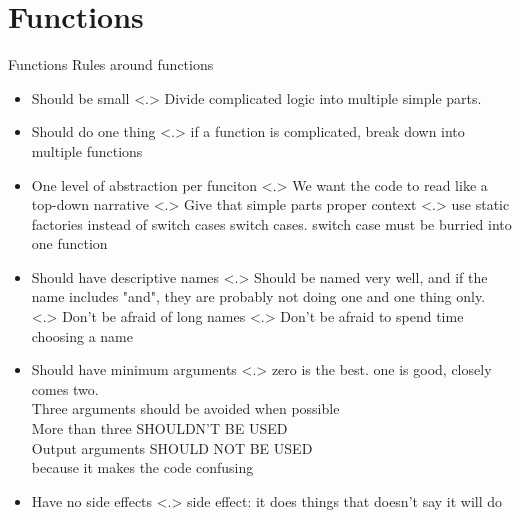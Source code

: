 \documentclass{beamer}
\begin{document}
\section{Functions}
\begin{frame}{Functions}
  Rules around functions
  \begin{itemize}[<+->]
    \item Should be small
    \note[item]<.>{
      Divide complicated logic into multiple simple parts.
    }
    \item Should do one thing
    \note[item]<.>{
      if a function is complicated, break down into multiple functions
    }
    \item One level of abstraction per funciton
    \note[item]<.>{
      We want the code to read like a top-down narrative
    }
    \note[item]<.>{
      Give that simple parts proper context
    }
    \note[item]<.>{
      use static factories instead of switch cases switch cases. switch case must be burried into one function
    }
    \item Should have descriptive names
    \note[item]<.>{
      Should be named very well, and if the name includes "and", they are probably not doing one and one thing only.
    }
    \note[item]<.>{
      Don't be afraid of long names
    }
    \note[item]<.>{
      Don't be afraid to spend time choosing a name
    }
    \item Should have minimum arguments
    \note[item]<.>{ 
      zero is the best. one is good, closely comes two.\\
      Three arguments should be avoided when possible\\
      More than three SHOULDN'T BE USED \\ 
      Output arguments SHOULD NOT BE USED \\
      because it makes the code confusing
    }
    \item Have no side effects
    \note[item]<.>{ 
      side effect: it does things that doesn't say it will do
    }
  \end{itemize}
\end{frame}
\end{document}
